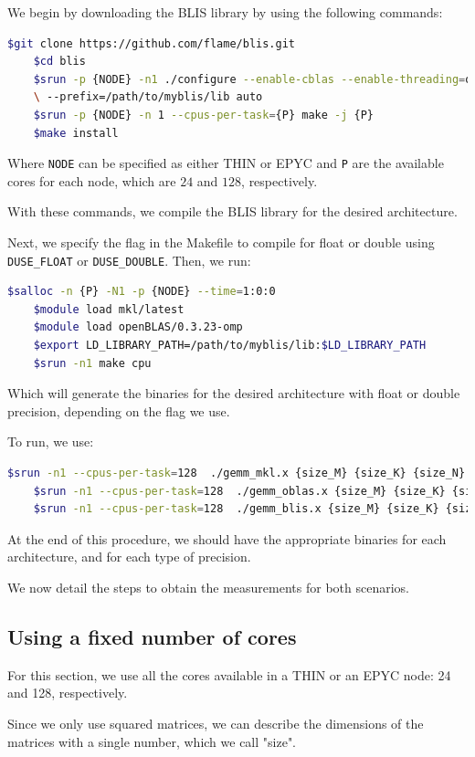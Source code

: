 \documentclass{report}
\begin{document}
We begin by downloading the BLIS library by using the following commands:
\begin{lstlisting}[language=bash]
    $git clone https://github.com/flame/blis.git
    $cd blis
    $srun -p {NODE} -n1 ./configure --enable-cblas --enable-threading=openmp \
    \ --prefix=/path/to/myblis/lib auto
    $srun -p {NODE} -n 1 --cpus-per-task={P} make -j {P}
    $make install
\end{lstlisting}

Where \texttt{NODE} can be specified as either THIN or EPYC and 
\texttt{P} are the available cores for each node, which are $24$ and $128$, respectively.

With these commands, we compile the BLIS library for the desired 
architecture.

Next, we specify the flag in the Makefile to compile for float or double using 
\texttt{\-DUSE\_FLOAT} or \texttt{\-DUSE\_DOUBLE}. Then, we run:
\begin{lstlisting}[language=bash]
    $salloc -n {P} -N1 -p {NODE} --time=1:0:0
    $module load mkl/latest
    $module load openBLAS/0.3.23-omp
    $export LD_LIBRARY_PATH=/path/to/myblis/lib:$LD_LIBRARY_PATH
    $srun -n1 make cpu
\end{lstlisting}

Which will generate the binaries for the desired architecture with float or 
double precision, depending on the flag we use.

To run, we use: 
\begin{lstlisting}[language=bash]
    $srun -n1 --cpus-per-task=128  ./gemm_mkl.x {size_M} {size_K} {size_N}
    $srun -n1 --cpus-per-task=128  ./gemm_oblas.x {size_M} {size_K} {size_N}
    $srun -n1 --cpus-per-task=128  ./gemm_blis.x {size_M} {size_K} {size_N}
\end{lstlisting}

At the end of this procedure, we should have the appropriate binaries for each 
architecture, and for each type of precision.

We now detail the steps to obtain the measurements for both scenarios.

\subsection{Using a fixed number of cores}

For this section, we use all the cores available in a THIN or an EPYC node: 24 
and 128, respectively. 

Since we only use squared matrices, we can describe the dimensions of the matrices 
with a single number, which we call "size". 
\end{document}
